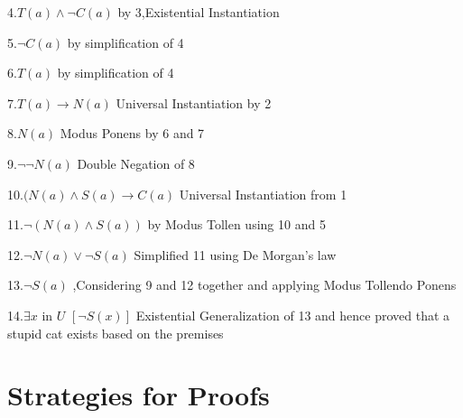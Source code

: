 \documentclass[a4paper,english]{article}
\begin{document}
4.$T(a)\wedge\lnot C(a)$ by 3,Existential Instantiation

5.$\lnot C(a)$ by simplification of 4

6.$T(a)$ by simplification of 4

7.$T(a)\rightarrow N(a)$ Universal Instantiation by 2

8.$N(a)$ Modus Ponens by 6 and 7

9.$\lnot\lnot N(a)$ Double Negation of 8

10.$(N(a)\wedge S(a)\rightarrow C(a)$ Universal Instantiation from
1

11.$\lnot(N(a)\wedge S(a))$ by Modus Tollen using 10 and 5 

12.$\lnot N(a)\vee\lnot S(a)$ Simplified 11 using De Morgan's law

13.$\lnot S(a)$ ,Considering 9 and 12 together and applying Modus
Tollendo Ponens

14.$\exists x$ in $U$ $[\lnot S(x)]$ Existential Generalization
of 13 and hence proved that a stupid cat exists based on the premises


\section{Strategies for Proofs}
\end{document}
